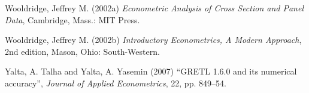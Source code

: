 \begin{thebibliography}
  Wooldridge, Jeffrey M. (2002a) \emph{Econometric Analysis of Cross
    Section and Panel Data}, Cambridge, Mass.: MIT Press.

  Wooldridge, Jeffrey M. (2002b) \emph{Introductory Econometrics, A
    Modern Approach}, 2nd edition, Mason, Ohio: South-Western.

  Yalta, A. Talha and Yalta, A. Yasemin (2007) ``GRETL 1.6.0 and its
  numerical accuracy'', \emph{Journal of Applied Econometrics}, 22,
  pp. 849--54.

\end{thebibliography}


